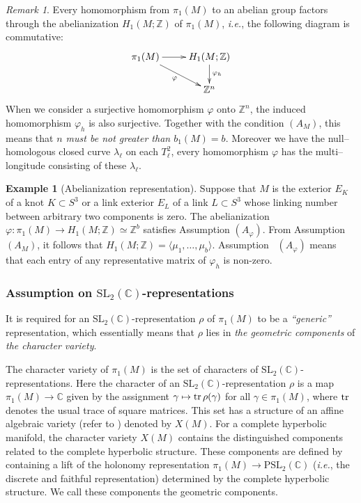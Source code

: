 \documentclass[a4paper]{amsart}
\theoremstyle{plain}
\theoremstyle{definition}
\newtheorem{example}{Example}%
\theoremstyle{remark}
\newtheorem{remark}{Remark}%
\newcommand{\ie}{\emph{i.e.}}
\newcommand{\ZZ}{{\mathbb Z}}
\newcommand{\CC}{{\mathbb C}}
\newcommand{\SL}{{\mathrm{SL}_2(\CC)}}
\newcommand{\PSL}{{\mathrm{PSL}_2(\CC)}}
\newcommand{\trace}{{\rm tr}\,}
\begin{document}
\begin{remark}
  Every homomorphism from $\pi_1(M)$ to an abelian group factors
  through the abelianization $H_1(M;\ZZ)$ of $\pi_1(M)$, \ie, the
  following diagram is commutative:
  $$
  \xymatrix@R=20pt{
    \pi_1(M) \ar[rd]_{\varphi} \ar[r] & 
    H_1(M;\ZZ) \ar[d]^{\varphi_h}\\
     & 
    \ZZ^n 
  }
  $$
  When we consider a surjective homomorphism $\varphi$ onto $\ZZ^n$,
  the induced homomorphism $\varphi_h$ is also surjective. Together
  with the condition $(A_M)$, this means that \emph{$n$ must be not greater than  $b_1(M) = b$}.  Moreover we have the null--homologous closed
  curve $\lambda_\ell$ on each $T^2_\ell$, every homomorphism $\varphi$ has
  the multi--longitude consisting of these $\lambda_\ell$.
\end{remark}

\begin{example}[Abelianization representation]\label{ex:ab}
 Suppose that $M$ is the exterior $E_K$ of a knot $K \subset S^3$ or a link exterior $E_L$ of a link $L \subset S^3$ whose linking number between arbitrary two components is zero. The
abelianization $\varphi\colon \pi_1(M) \to H_1(M; \ZZ) \simeq \ZZ^b$ satisfies Assumption $(A_\varphi)$.  From Assumption~$(A_M)$, it follows that $H_1(M;\ZZ)
= \langle \mu_1, \ldots, \mu_b\rangle$.  Assumption ~$(A_\varphi)$
means that each entry of any representative matrix of $\varphi_h$ is
non-zero.
\end{example}

\subsubsection{Assumption on $\SL$-representations}

It is required for an $\SL$-representation $\rho$ of $\pi_1(M)$ to be
a {\it ``generic''} representation, which essentially means that
$\rho$ lies in {\it the geometric components} of {\it the character
  variety}.
  
The character variety of $\pi_1(M)$ is the set of characters of
$\SL$-representations. Here the character of an $\SL$-representation
$\rho$ is a map $\pi_1(M) \to \CC$ given by the assignment $\gamma
\mapsto \trace \rho(\gamma)$ for all $\gamma \in \pi_1(M)$, where $\trace$ denotes the usual trace of square matrices.  This set
has a structure of an affine algebraic variety (refer to
\cite{CS:1983}) denoted by $X(M)$. For a complete hyperbolic manifold,
the character variety $X(M)$ contains the distinguished components
related to the complete hyperbolic structure.  These components are
defined by containing a lift of the holonomy representation $\pi_1(M)
\to \PSL$ (\ie, the discrete and faithful representation)  determined by the complete hyperbolic structure.
We call these components the geometric components.
\end{document}
